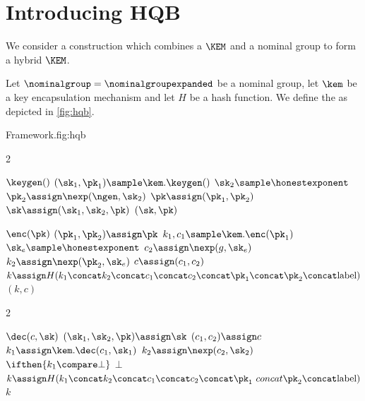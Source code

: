 \section{Introducing HQB}\label{sec:hqb}

We consider a construction which combines a $\KEM$ and a nominal group to form a hybrid $\KEM$.


\begin{definition}[\hqb] \label{def:hqb}

    Let $\nominalgroup = \nominalgroupexpanded$ be a nominal group, let $\kem$ be a key encapsulation mechanism and let $H$ be a hash function.
    We define the \hqb \kem as depicted in \autoref{fig:hqb}.

    \begin{gamefigure}{\hqb Framework.}{fig:hqb}
        \begin{games}{2}
            \begin{gameenv}{\algor $\keygen()$}
                \State $(\sk_1, \pk_1)  \sample \kem.\keygen()$
                \State $\sk_2 \sample \honestexponent$
                \State $\pk_2 \assign \nexp(\ngen, \sk_2)$
                \State $\pk \assign (\pk_1, \pk_2)$
                \State $\sk \assign (\sk_1, \sk_2, \pk)$
                \State \Return $(\sk, \pk)$
            \end{gameenv}
            \columnbreak
            \begin{gameenv}{\algor $\enc(\pk)$}
                \State $(\pk_1, \pk_2) \assign \pk$
                \State $k_1, c_1 \sample \kem.\enc(\pk_1)$
                \State $\sk_e \sample \honestexponent$
                \State $c_2 \assign \nexp(g, \sk_e)$
                \State $k_2 \assign \nexp(\pk_2, \sk_e)$
                \State $c \assign (c_1, c_2)$
                \State $k \assign H(k_1 \concat k_2 \concat c_1 \concat c_2 \concat \pk_1 \concat \pk_2 \concat \text{label})$
                \State \Return $(k, c)$
            \end{gameenv}
        \end{games}

        \begin{games}{2}
            \begin{gameenv}{\algor $\dec(c, \sk)$}
                \State $(\sk_1, \sk_2, \pk) \assign \sk$
                \State $(c_1, c_2) \assign c$
                \State $k_1 \assign \kem.\dec(c_1, \sk_1)$
                \State $k_2 \assign \nexp(c_2, \sk_2)$
                \State $\ifthen{k_1 \compare \bot}$
                    \State \quad \Return $\bot$
                    \State $k \assign H(k_1 \concat k_2 \concat c_1 \concat c_2 \concat \pk_1 \ concat \pk_2 \concat \text{label})$
                    \State \Return $k$
                \end{gameenv}
                \gamebreak
                \emptygame
            \end{games}
        \end{gamefigure}

    \end{definition}

